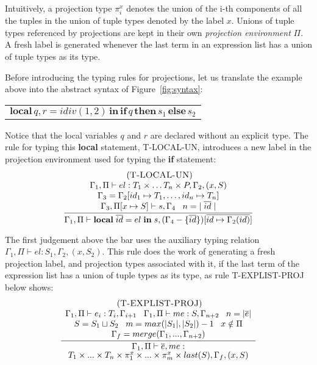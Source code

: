 \documentclass{sigplanconf}
\newcommand{\mylabel}[1]{\; (\textsc{#1})}
\newcommand{\env}{\Gamma}
\newcommand{\penv}{\Pi}
\begin{document}
Intuitively, a projection type $\pi_{i}^{x}$ denotes the union of
the i-th components of all the tuples in the union of tuple types
denoted by the label $x$. Unions of tuple types referenced by projections are kept in their own {\em projection environment} $\Pi$. A fresh label is generated whenever the last term
in an expression list has a union of tuple types as its type.

Before introducing the typing rules for projections, let us translate the example above into the abstract syntax of Figure~\ref{fig:syntax}:
\begin{center}
	\begin{tabular}{ll}
		\multicolumn{2}{l}{$\mathbf{local} \, q, r = idiv(1, 2) \, \mathbf{in} \, \mathbf{if} \, q \, \mathbf{then} \, s_1 \, \mathbf{else} \, s_2$}
	\end{tabular}
\end{center}

Notice that the local variables $q$ and $r$ are declared without 
an explicit type. The rule for typing this {\bf local} statement,
{\sc T-LOCAL-UN}, introduces a new label in the projection
environment used for typing the {\bf if} statement:
\[
\begin{array}{c}
\mylabel{T-LOCAL-UN}\\
\dfrac{\begin{array}{c}
	\env_{1}, \penv \vdash el:T_1 \times \ldots T_n \times P, \env_{2}, (x,S)\\
	\env_{3} = \env_{2}[id_{1} \mapsto T_1, \ldots, id_{n} \mapsto T_n]\\
	\env_{3}, \penv[x \mapsto S] \vdash s, \env_{4} \;\;\;
	n = |\;\overline{id}\;|  
	\end{array}}
{\env_{1}, \penv \vdash \mathbf{local} \; \overline{id} = el \; \mathbf{in} \; s, (\env_{4}-\{\overline{id}\})[\overline{id \mapsto \env_2(id)}]}
\end{array}
\]

The first judgement above the bar uses the auxiliary typing relation $\env_{1}, \penv \vdash el : S_{1}, \env_{2}, (x,S_{2})$.
This rule does the work of generating a fresh projection label,
and projection types associated with it, if the last term of
the expression list has a union of tuple types as its type,
as rule {\sc T-EXPLIST-PROJ} below shows:
\[
\begin{array}{c}
\mylabel{T-EXPLIST-PROJ}\\
\dfrac{\begin{array}{c}
	\env_{1}, \penv \vdash e_{i}:T_{i}, \env_{i+1} \;\;\;
	\env_{1}, \penv \vdash me:S, \env_{n+2} \;\;\; n=|\overline{e}|\\
	S = S_1 \sqcup S_2 \;\;\;m = max(|S_1|, |S_2|)-1 \;\;\; x \notin \Pi\\
	\env_{f} = merge(\env_{1}, ..., \env_{n+2})
	\end{array}}
{\env_{1}, \penv \vdash \overline{e},me:}\\ {T_{1} \times ... \times T_{n} \times \pi_{1}^{x} \times ... \times \pi_{m}^{x} \times last(S), \env_{f}, (x,S)}
\end{array}
\]
\end{document}
